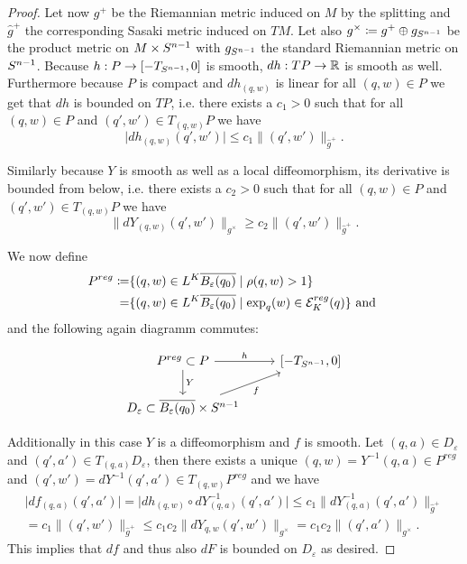 \begin{proof}
    Let now $g^+$ be the Riemannian metric induced on $M$ by the splitting and $\widehat{g}^+$ the corresponding Sasaki metric induced on $TM$. Let also $g^\times\coloneqq g^+ \oplus g_{S^{n-1}}$ be the product metric on $M\times {S^{n-1}}$ with $g_{S^{n-1}}$ the standard Riemannian metric on ${S^{n-1}}$.
    Because $h:P\to [-T_{S^{n-1}},0]$ is smooth, $dh:TP\to \mathbb{R}$ is smooth as well. Furthermore because $P$ is compact and $dh_{(q,w)}$ is linear for all $(q,w)\in P$ we get that $dh$ is bounded on $TP$, i.e. 
    there exists a $c_1>0$ such that for all $(q,w)\in P$ and $(q',w')\in T_{(q,w)}P$ we have
    \[
        \lvert dh_{(q,w)}(q',w') \rvert \leq c_1\lVert (q',w') \rVert_{\widehat{g}^+}.
    \]

    Similarly because $Y$ is smooth as well as a local diffeomorphism, its derivative is bounded from below, i.e. there exists a $c_2>0$ such that for all $(q,w)\in P$ and $(q',w')\in T_{(q,w)}P$ we have
    \[
        \lVert dY_{(q,w)}(q',w') \rVert_{g^\times} \geq c_2\lVert (q',w') \rVert_{\widehat{g}^+}.
    \]

    We now define 
    \begin{align*}
        P^{reg}\coloneqq & \{(q,w)\in L^K{\overline{B_\varepsilon(q_0)}} \mid \rho(q,w) > 1\}\\
        =& \{(q,w)\in L^K{\overline{B_\varepsilon(q_0)}} \mid \exp_q(w)\in {{\mathcal{E}}^{reg}_K}(q)\} \text{ and }
    \end{align*} and the following again diagramm commutes:

    \[\begin{tikzcd}
        {P^{reg}\subset P} & {[-T_\sn,0]} \\
        {D_\varepsilon\subset \cl{B_\varepsilon(q_0)}\times \sn}
        \arrow["Y", from=1-1, to=2-1]
        \arrow["h", from=1-1, to=1-2]
        \arrow["f"', from=2-1, to=1-2]
    \end{tikzcd}\]   

    Additionally in this case $Y$ is a diffeomorphism and $f$ is smooth. Let $(q,a)\in D_\varepsilon$ and $(q',a')\in T_{(q,a)}D_\varepsilon$, then there exists a unique $(q,w)=Y^{-1}(q,a)\in P^{reg}$ and $(q',w')=dY^{-1}(q',a')\in T_{(q,w)}P^{reg}$ and we have 
    \begin{align*}
        \lvert df_{(q,a)}(q',a') \rvert = \lvert dh_{(q,w)}\circ dY^{-1}_{(q,a)}(q',a')\rvert\leq c_1 \lVert dY^{-1}_{(q,a)}(q',a')\rVert_{\widehat{g}^+} \\
        = c_1\lVert (q',w') \rVert_{\widehat{g}^+} \leq c_1c_2\lVert dY_{q,w}(q',w') \rVert_{g^\times} = c_1c_2\lVert(q',a')\rVert_{g^\times}.
    \end{align*}
    This implies that $df$ and thus also $dF$ is bounded on $D_\varepsilon$ as desired.
\end{proof}